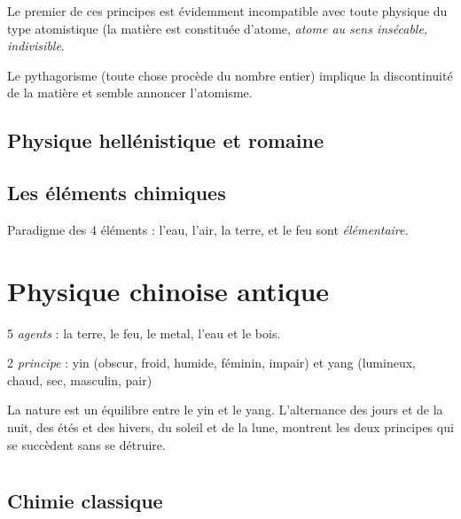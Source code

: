 Le premier de ces principes est évidemment incompatible avec toute physique du type atomistique (la matière est constituée d'atome, {\it atome au sens insécable, indivisible}.

Le pythagorisme (toute chose procède du nombre entier) implique la discontinuité de la matière et semble annoncer l'atomisme.


\subsection{Physique hellénistique et romaine}

\subsection{Les éléments chimiques}


\begin{center}
Paradigme des 4 éléments : l'eau, l'air, la terre, et le feu sont \it{élémentaire}.
\end{center}

\section{Physique chinoise antique}

\begin{center}
5 {\it agents} : la terre, le feu, le metal, l'eau et le bois.

2 {\it principe} : yin (obscur, froid, humide, féminin, impair) et yang (lumineux, chaud, sec, masculin, pair)
\end{center}

La nature est un équilibre entre le yin et le yang. L'alternance des jours et de la nuit, des étés et des hivers, du soleil et de la lune, montrent les deux principes qui se succèdent sans se détruire.


\section{}
\subsection{Chimie classique}

